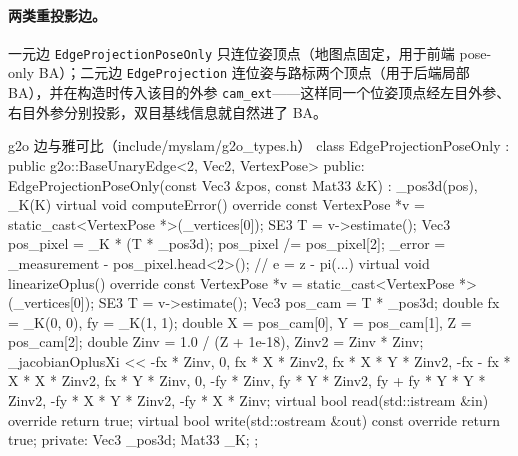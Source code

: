 \paragraph{两类重投影边。}
一元边 \texttt{EdgeProjectionPoseOnly} 只连位姿顶点（地图点固定，用于前端 pose-only BA）；二元边 \texttt{EdgeProjection} 连位姿与路标两个顶点（用于后端局部 BA），并在构造时传入该目的外参 \texttt{cam\_ext}——这样同一个位姿顶点经左目外参、右目外参分别投影，双目基线信息就自然进了 BA。

\begin{codebox}[C++]{g2o 边与雅可比（include/myslam/g2o\_types.h）}
class EdgeProjectionPoseOnly : public g2o::BaseUnaryEdge<2, Vec2, VertexPose> {
   public:
    EdgeProjectionPoseOnly(const Vec3 &pos, const Mat33 &K) : _pos3d(pos), _K(K) {}
    virtual void computeError() override {
        const VertexPose *v = static_cast<VertexPose *>(_vertices[0]);
        SE3 T = v->estimate();
        Vec3 pos_pixel = _K * (T * _pos3d);
        pos_pixel /= pos_pixel[2];
        _error = _measurement - pos_pixel.head<2>();    // e = z - pi(...)
    }
    virtual void linearizeOplus() override {
        const VertexPose *v = static_cast<VertexPose *>(_vertices[0]);
        SE3 T = v->estimate();
        Vec3 pos_cam = T * _pos3d;
        double fx = _K(0, 0), fy = _K(1, 1);
        double X = pos_cam[0], Y = pos_cam[1], Z = pos_cam[2];
        double Zinv = 1.0 / (Z + 1e-18), Zinv2 = Zinv * Zinv;
        _jacobianOplusXi << -fx * Zinv, 0, fx * X * Zinv2, fx * X * Y * Zinv2,
            -fx - fx * X * X * Zinv2, fx * Y * Zinv, 0, -fy * Zinv,
            fy * Y * Zinv2, fy + fy * Y * Y * Zinv2, -fy * X * Y * Zinv2, -fy * X * Zinv;
    }
    virtual bool read(std::istream &in) override  { return true; }
    virtual bool write(std::ostream &out) const override { return true; }
   private:
    Vec3 _pos3d; Mat33 _K;
};


\end{codebox}
